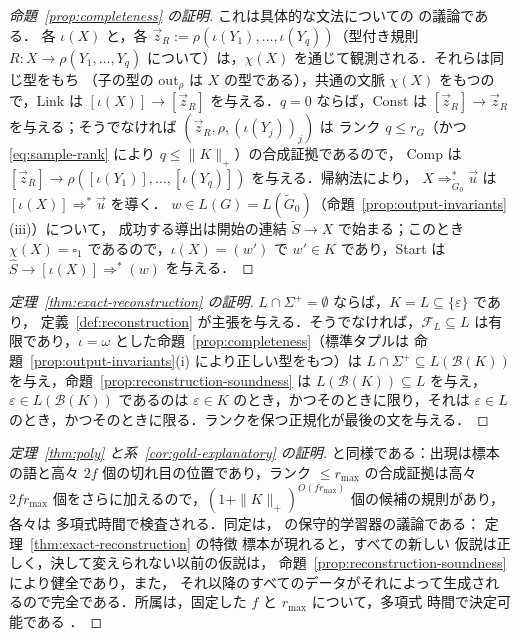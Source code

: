 \documentclass[11pt,a4paper]{ltjsarticle}
\numberwithin{equation}{section}
\theoremstyle{plain}
\theoremstyle{definition}
\theoremstyle{remark}
\newcommand{\out}{\mathrm{out}}
\newcommand{\tuple}[1]{\vec{#1}}
\newcommand{\blank}{\square}
\newcommand{\eps}{\varepsilon}
\theoremstyle{plain}
\begin{document}
\begin{proof}[命題~\ref{prop:completeness} の証明]
これは具体的な文法についての \cite[Lemma~3]{Yoshinaka2015General} の議論である．
各 $\iota(X)$ と，各
$\tuple z_R:=\rho(\iota(Y_1),\ldots,\iota(Y_q))$（型付き規則
$R:X\to\rho(Y_1,\ldots,Y_q)$ について）は，$\chi(X)$ を通じて観測される．それらは同じ型をもち
（子の型の $\out_\rho$ は $X$ の型である），共通の文脈
$\chi(X)$ をもつので，Link は $[\iota(X)]\to[\tuple z_R]$ を与える．$q=0$ ならば，Const は
$[\tuple z_R]\to\tuple z_R$ を与える；そうでなければ $(\tuple z_R,\rho,(\iota(Y_j))_j)$ は
ランク $q\le r_G$（かつ \eqref{eq:sample-rank} により $q\le\|K\|_+$）の合成証拠であるので，
Comp は $[\tuple z_R]\to\rho([\iota(Y_1)],\ldots,[\iota(Y_q)])$ を与える．帰納法により，
$X\Rightarrow^*_{\widetilde G_0}\tuple u$ は $[\iota(X)]\Rightarrow^*\tuple u$ を導く．
$w\in L(G)=L(\widetilde G_0)$（命題~\ref{prop:output-invariants}(iii)）について，
成功する導出は開始の連結 $\widetilde S\to X$ で始まる；このとき
$\chi(X)=\blank_1$ であるので，$\iota(X)=(w')$ で $w'\in K$ であり，Start は
$\widehat S\to[\iota(X)]\Rightarrow^*(w)$ を与える．
\end{proof}

\begin{proof}[定理~\ref{thm:exact-reconstruction} の証明]
$L\cap\Sigma^+=\emptyset$ ならば，$K=L\subseteq\{\eps\}$ であり，
定義~\ref{def:reconstruction} が主張を与える．そうでなければ，$\mathcal F_L\subseteq L$
は有限であり，$\iota=\omega$ とした命題~\ref{prop:completeness}（標準タプルは
命題~\ref{prop:output-invariants}(i) により正しい型をもつ）は
$L\cap\Sigma^+\subseteq L(\mathcal B(K))$ を与え，命題~\ref{prop:reconstruction-soundness}
は $L(\mathcal B(K))\subseteq L$ を与え，$\eps\in L(\mathcal B(K))$ であるのは $\eps\in K$ のとき，かつそのときに限り，それは
$\eps\in L$ のとき，かつそのときに限る．ランクを保つ正規化が最後の文を与える．
\end{proof}

\begin{proof}[定理~\ref{thm:poly} と系~\ref{cor:gold-explanatory} の証明]
\cite[Lemma~6]{Yoshinaka2011} と同様である：出現は標本の語と高々
$2f$ 個の切れ目の位置であり，ランク $\le r_{\max}$ の合成証拠は高々
$2fr_{\max}$ 個をさらに加えるので，$(1+\|K\|_+)^{O(fr_{\max})}$ 個の候補の規則があり，各々は
多項式時間で検査される．同定は，
\cite[Corollary~1 and Theorem~1]{Yoshinaka2011} の保守的学習器の議論である：
定理~\ref{thm:exact-reconstruction} の特徴
標本が現れると，すべての新しい
仮説は正しく，決して変えられない以前の仮説は，
命題~\ref{prop:reconstruction-soundness} により健全であり，また，
それ以降のすべてのデータがそれによって生成されるので完全である．所属は，固定した $f$ と $r_{\max}$ について，多項式
時間で決定可能である \cite[Proposition~4]{Yoshinaka2011}．
\end{proof}
\end{document}

